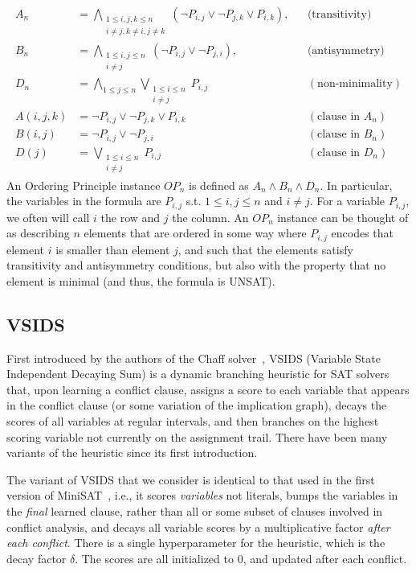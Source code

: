 \documentclass[10pt,a4paper]{article}
\begin{document}
\begin{align*}
A_n &= \bigwedge_{\substack{1 \le i,j,k \le n \\ i \ne j, k \ne i, j \ne k}} (\neg P_{i,j} \lor \neg P_{j,k} \lor P_{i,k}), &&(\text{transitivity)}\\
%
B_n &= \bigwedge_{\substack{1 \le i,j \le n \\ i \ne j}} (\neg P_{i,j} \lor \neg P_{j,i}), && \text{(antisymmetry)}\\
%
D_n &= \bigwedge_{1 \le j \le n} \bigvee_{\substack{1 \le i \le n \\ i \ne j}} P_{i,j} && (\text{non-minimality})\\
%
A(i, j, k) &= \neg P_{i,j} \lor \neg P_{j,k} \lor P_{i,k} && (\text{clause in $A_n$})\\
%
B(i, j) &= \neg P_{i,j} \lor \neg P_{j,i} && (\text{clause in $B_n$})\\
%
D(j) &= \bigvee_{\substack{1 \le i \le n \\ i \ne j}} P_{i,j} && (\text{clause in $D_n$})
\end{align*}
\noindent An Ordering Principle instance $OP_n$ is defined as $A_n \land B_n \land D_n$. In particular, the variables in the formula are $P_{i, j}$ s.t. $1 \leq i, j \leq n$ and $i \neq j$. For a variable $P_{i, j}$, we often will call $i$ the row and $j$ the column. An $OP_n$ instance can be thought of as describing $n$ elements that are ordered in some way where $P_{i, j}$ encodes that element $i$ is smaller than element $j$, and such that the elements satisfy transitivity and antisymmetry conditions, but also with the property that no element is minimal (and thus, the formula is UNSAT).

\subsection{VSIDS}

First introduced by the authors of the Chaff solver~\cite{chaff}, VSIDS (Variable State Independent Decaying Sum) is a dynamic branching heuristic for SAT solvers that, upon learning a conflict clause, assigns a score to each variable that appears in the conflict clause (or some variation of the implication graph), decays the scores of all variables at regular intervals, and then branches on the highest scoring variable not currently on the assignment trail. There have been many variants of the heuristic since its first introduction. 

The variant of VSIDS that we consider is identical to that used in the first version of MiniSAT~\cite{minisat}, i.e., it scores \textit{variables} not literals, bumps the variables in the \textit{final} learned clause, rather than all or some subset of clauses involved in conflict analysis, and decays all variable scores by a multiplicative factor \textit{after each conflict}. There is a single hyperparameter for the heuristic, which is the decay factor $\delta$. The scores are all initialized to $0$, and updated after each conflict. 
\end{document}
